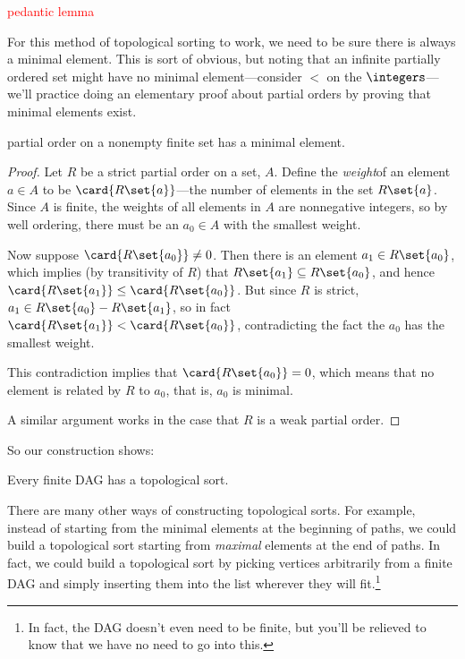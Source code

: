 \begin{editingnotes}
\textcolor{red}{pedantic lemma}

For this method of topological sorting to work, we need to be sure
there is always a minimal element.  This is sort of obvious, but
noting that an infinite partially ordered set might have no minimal
element---consider $<$ on the $\integers$---we'll practice doing an
elementary proof about partial orders by proving that minimal elements
exist.

\begin{lemma}\label{finmin}
   partial order on a nonempty finite set
  has a minimal element.

\begin{proof} Let $R$ be a strict partial order on a set, $A$.  Define
 the \emph{weight}of an element $a \in A$ to be
 $\card{R\set{a}}$---the number of elements in the set $R\set{a}$.
 Since $A$ is finite, the weights of all elements in $A$ are
 nonnegative integers, so by well ordering, there must be an $a_0 \in
 A$ with the smallest weight.

Now suppose $\card{R\set{a_0}} \neq 0$.  Then there is an element $a_1 \in
R\set{a_0}$, which implies (by transitivity of $R$) that $R\set{a_1}
\subseteq R\set{a_0}$, and hence $\card{R\set{a_1}} \leq
\card{R\set{a_0}}$.  But since $R$ is strict, $a_1 \in R\set{a_0} -
R\set{a_1}$, so in fact $\card{R\set{a_1}} < \card{R\set{a_0}}$,
contradicting the fact the $a_0$ has the smallest weight.

This contradiction implies that $\card{R\set{a_0}} = 0$, which means that
no element is related by $R$ to $a_0$, that is, $a_0$ is minimal.

A similar argument works in the case that $R$ is a weak partial order.

\end{proof}
\end{lemma}

\end{editingnotes}

So our construction shows:

\begin{theorem}\label{thm:topological}
Every finite DAG has a topological sort.
\end{theorem}

There are many other ways of constructing topological sorts.  For
example, instead of starting from the minimal elements at the
beginning of paths, we could build a topological sort starting from
\emph{maximal} elements at the end of paths.  In fact, we could build
a topological sort by picking vertices arbitrarily from a finite DAG
and simply inserting them into the list wherever they will
fit.\footnote{In fact, the DAG doesn't even need to be finite, but
  you'll be relieved to know that we have no need to go into this.}

